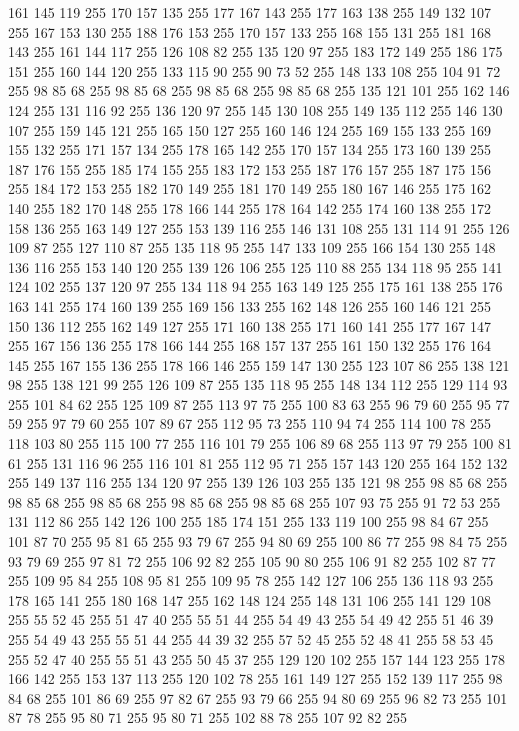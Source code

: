 161 145 119 255 170 157 135 255 177 167 143 255 177 163 138 255 149 132 107 255 167 153 130 255 188 176 153 255 170 157 133 255 168 155 131 255 181 168 143 255 161 144 117 255 126 108 82 255 135 120 97 255 183 172 149 255 186 175 151 255 160 144 120 255 133 115 90 255 90 73 52 255 148 133 108 255 104 91 72 255 98 85 68 255 98 85 68 255 98 85 68 255 98 85 68 255 135 121 101 255 162 146 124 255 131 116 92 255 136 120 97 255 145 130 108 255 149 135 112 255 146 130 107 255 159 145 121 255 165 150 127 255 160 146 124 255 169 155 133 255 169 155 132 255 171 157 134 255 178 165 142 255 170 157 134 255 173 160 139 255 187 176 155 255 185 174 155 255 183 172 153 255 187 176 157 255 187 175 156 255 184 172 153 255 182 170 149 255 181 170 149 255 180 167 146 255 175 162 140 255 182 170 148 255 178 166 144 255 178 164 142 255 174 160 138 255 172 158 136 255 163 149 127 255 153 139 116 255 146 131 108 255 131 114 91 255 126 109 87 255 127 110 87 255 135 118 95 255 147 133 109 255 166 154 130 255
148 136 116 255 153 140 120 255 139 126 106 255 125 110 88 255 134 118 95 255 141 124 102 255 137 120 97 255 134 118 94 255 163 149 125 255 175 161 138 255 176 163 141 255 174 160 139 255 169 156 133 255 162 148 126 255 160 146 121 255 150 136 112 255 162 149 127 255 171 160 138 255 171 160 141 255 177 167 147 255 167 156 136 255 178 166 144 255 168 157 137 255 161 150 132 255 176 164 145 255 167 155 136 255 178 166 146 255 159 147 130 255 123 107 86 255 138 121 98 255 138 121 99 255 126 109 87 255 135 118 95 255 148 134 112 255 129 114 93 255 101 84 62 255 125 109 87 255 113 97 75 255 100 83 63 255 96 79 60 255 95 77 59 255 97 79 60 255 107 89 67 255 112 95 73 255 110 94 74 255 114 100 78 255 118 103 80 255 115 100 77 255 116 101 79 255 106 89 68 255 113 97 79 255 100 81 61 255 131 116 96 255 116 101 81 255 112 95 71 255 157 143 120 255 164 152 132 255 149 137 116 255 134 120 97 255 139 126 103 255 135 121 98 255 98 85 68 255 98 85 68 255 98 85 68 255
98 85 68 255 98 85 68 255 107 93 75 255 91 72 53 255 131 112 86 255 142 126 100 255 185 174 151 255 133 119 100 255 98 84 67 255 101 87 70 255 95 81 65 255 93 79 67 255 94 80 69 255 100 86 77 255 98 84 75 255 93 79 69 255 97 81 72 255 106 92 82 255 105 90 80 255 106 91 82 255 102 87 77 255 109 95 84 255 108 95 81 255 109 95 78 255 142 127 106 255 136 118 93 255 178 165 141 255 180 168 147 255 162 148 124 255 148 131 106 255 141 129 108 255 55 52 45 255 51 47 40 255 55 51 44 255 54 49 43 255 54 49 42 255 51 46 39 255 54 49 43 255 55 51 44 255 44 39 32 255 57 52 45 255 52 48 41 255 58 53 45 255 52 47 40 255 55 51 43 255 50 45 37 255 129 120 102 255 157 144 123 255 178 166 142 255 153 137 113 255 120 102 78 255 161 149 127 255 152 139 117 255 98 84 68 255 101 86 69 255 97 82 67 255 93 79 66 255 94 80 69 255 96 82 73 255 101 87 78 255 95 80 71 255 95 80 71 255 102 88 78 255 107 92 82 255
